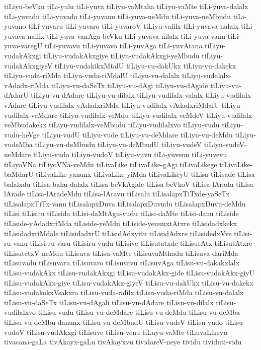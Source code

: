 {tiLiyu-beVku
tiLi-yulu
tiLi-yuva
tiLiyu-vaMtaha
tiLiyu-vaMte
tiLi-yuva-dalalx
tiLi-yuvadu
tiLi-yuvado
tiLi-yuvanu
tiLi-yuva-neMdu
tiLi-yuva-neMbudu
tiLi-yuvano
tiLi-yuvaru
tiLi-yuvaro
tiLi-yuvaroV
tiLiyu-valilx
tiLi-yuvava-nalalx
tiLi-yuvava-nalilx
tiLi-yuva-vanAga-beVku
tiLi-yuvava-nilalx
tiLi-yuva-vanu
tiLi-yuva-varegU
tiLi-yuvavu
tiLi-yuvavo
tiLi-yuvAga
tiLi-yuvAtana
tiLiyu-vudakAkxgi
tiLiyu-vudakAkxgiye
tiLiyu-vudakAkxgi-yeMbudu
tiLiyu-vudakAkxgiyeV
tiLiyu-vudakikxMtalU
tiLiyu-vu-dakUkx
tiLiyu-vu-dakekx
tiLiyu-vuda-riMda
tiLiyu-vuda-riMdalU
tiLiyu-vu-dalalx
tiLiyu-vudalalx-vAdadx-riMda
tiLiyu-vu-daSeTx
tiLiyu-vu-dAgi
tiLiyu-vu-dAgide
tiLiyu-vu-dAdarU
tiLiyu-vu-dAdare
tiLiyu-vu-dilalx
tiLiyu-vudilalx-valalx
tiLiyu-vudilalx-vAdare
tiLiyu-vudilalx-vAdadxriMda
tiLiyu-vudilalx-vAdadxriMdalU
tiLiyu-vudilalx-veMdare
tiLiyu-vudilalx-veMdu
tiLiyu-vudilalx-veMdeV
tiLiyu-vudilalx-veMbudakekx
tiLiyu-vudilalx-veMbudu
tiLiyu-vudilalxvo
tiLiyu-vudu
tiLiyu-vudu-heVge
tiLiyu-vudU
tiLiyu-vude
tiLiyu-vu-deMdare
tiLiyu-vu-deMdu
tiLiyu-vudeMba
tiLiyu-vu-deMbudu
tiLiyu-vu-deMbudU
tiLiyu-vudeV
tiLiyu-vudeV-neMdare
tiLiyu-vudo
tiLiyu-vudoV
tiLiyu-vuvu
tiLi-yuvenu
tiLi-yuvevu
tiLiyoVNa
tiLiyoVNa-veMdu
tiLivaLike
tiLivaLike-gAgi
tiLivaLikege
tiLivaLike-baMdarU
tiLivaLike-yanunx
tiLivaLike-yiMda
tiLivaLikeyU
tiLisa
tiLisade
tiLisa-balalxdu
tiLisa-bahu-dalalx
tiLisa-beVkAgide
tiLisa-beVkoV
tiLisa-lAradu
tiLisa-lArade
tiLisa-lAradeMdu
tiLisa-lAravu
tiLisalu
tiLisalapxTiTxde-yaSeTx
tiLisalapxTiTx-vanu
tiLisalapxDuva
tiLisalapxDuvudu
tiLisalapxDuvu-deMdu
tiLisi
tiLisitu
tiLisida
tiLisi-daMtAgu-vudu
tiLisi-daMte
tiLisi-danu
tiLiside
tiLiside-yAdadxriMda
tiLiside-yeMdu
tiLiside-yenunxtAtxre
tiLisidadxkekx
tiLisidadxriMdale
tiLisidadxrU
tiLisidAdxyitu
tiLisidAdxre
tiLisidedxVve
tiLisi-ru-vanu
tiLisi-ru-varu
tiLisiru-vudu
tiLisive
tiLisutatxde
tiLisutAtx
tiLisutAtxre
tiLisutetxV-neMdu
tiLisuva
tiLisu-vaMte
tiLisuvaMthadu
tiLisuva-dariMda
tiLisuvadu
tiLisuvaru
tiLisuvaro
tiLisuvavu
tiLisuvAga
tiLisu-vu-dakakxlalx
tiLisu-vudakAkx
tiLisu-vudakAkxgi
tiLisu-vudakAkx-gide
tiLisu-vudakAkx-giyU
tiLisu-vudakAkx-giye
tiLisu-vudakAkx-giyeV
tiLisu-vu-dakUkx
tiLisu-vu-dakekx
tiLisu-vudakokxVsakxra
tiLisu-vuda-ralilx
tiLisu-vuda-riMda
tiLisu-vu-dalalx
tiLisu-vu-daSeTx
tiLisu-vu-dAgali
tiLisu-vu-dAdare
tiLisu-vu-dilalx
tiLisu-vudilalxvo
tiLisu-vudu
tiLisu-vu-deMdare
tiLisu-vu-deMdu
tiLisu-vu-deMba
tiLisu-vu-deMbu-danunx
tiLisu-vu-deMbudU
tiLisu-vudeV
tiLisu-vudo
tiLisu-vudoV
tiLisu-vudAkxgi
tiLisuve
tiLisu-venu
tiLuyu-vaMte
tiLuvaLikeyu
tivacana-gaLa
tivAkayx-gaLu
tivAkayxvu
tividareV-neye
tividu
tividuti-vidu
}
